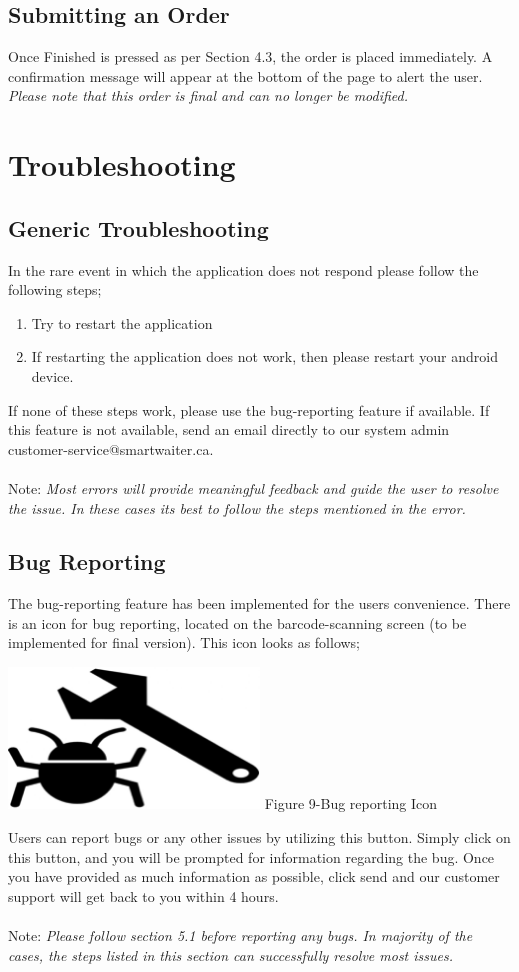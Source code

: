 \documentclass[12pt, titlepage]{article}
\begin{document}
\subsection{Submitting an Order}
Once Finished is pressed as per Section 4.3, the order is placed immediately. A confirmation message will appear at the bottom of the page to alert the user.  \emph{Please note that this order is final and can no longer be modified.}

\section{Troubleshooting}
\subsection{Generic Troubleshooting}
In the rare event in which the application does not respond please follow the following steps;
\begin{enumerate}
	\item Try to restart the application
	\item If restarting the application does not work, then please restart your android device.
	\end{enumerate}
	If none of these steps work, please use the bug-reporting feature if available. If this feature is not available, send an email directly to our system admin customer-service@smartwaiter.ca.\\\\
	Note:  \emph{Most errors will provide meaningful feedback and guide the user to resolve the issue. In these cases its best to follow the steps mentioned in the error.}
\subsection{Bug Reporting}
The bug-reporting feature has been implemented for the users convenience. There is an icon for bug reporting, located on the barcode-scanning screen (to be implemented for final version). This icon looks as follows;\\
\begin{center}
	\includegraphics[width=0.5\textwidth]{bugReport.png}
	\linebreak Figure 9-Bug reporting Icon
\end{center}
Users can report bugs or any other issues by utilizing this button. Simply click on this button, and you will be prompted for information regarding the bug. Once you have provided as much information as possible, click send and our customer support will get back to you within 4 hours.\\\\
Note:  \emph{Please follow section 5.1 before reporting any bugs.  In majority of the cases, the steps listed in this section can successfully resolve most issues.}
\end{document}
